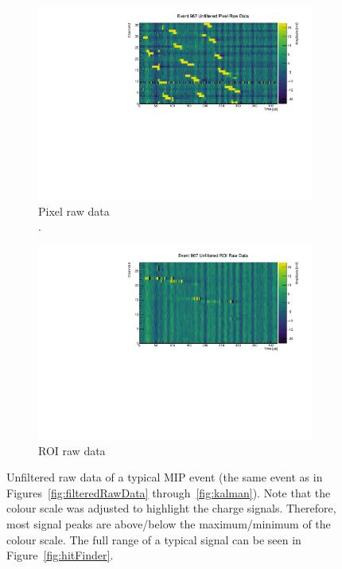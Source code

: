 \documentclass[instruments,article,submit,moreauthors,pdftex]{Definitions/mdpi}
\begin{document}
\begin{figure}[htb]
	\centering
	\begin{subfigure}{\textwidth}
		\centering
		\includegraphics[viewport=0 0 550 290, clip, width=\textwidth]{event967_rawUnfilteredPixel}
		\caption{Pixel raw data\\.}
		\label{fig:unfilteredRawData_a}
	\end{subfigure}
	\begin{subfigure}{\textwidth}
		\centering
		\includegraphics[viewport=0 0 550 290, clip, width=\textwidth]{event967_rawUnfilteredROI}
		\caption{ROI raw data}
		\label{fig:unfilteredRawData_b}
	\end{subfigure}
	\caption{Unfiltered raw data of a typical MIP event (the same event as in Figures~\ref{fig:filteredRawData} through~\ref{fig:kalman}).
		Note that the colour scale was adjusted to highlight the charge signals.
		Therefore, most signal peaks are above/below the maximum/minimum of the colour scale.
		The full range of a typical signal can be seen in Figure~\ref{fig:hitFinder}.}
	\label{fig:unfilteredRawData}
\end{figure}
\end{document}
